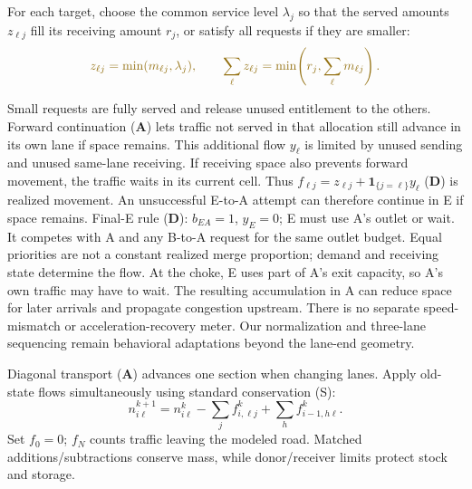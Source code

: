 \documentclass[10pt,a4paper]{article}
\newcommand{\Carey}[1]{\textcolor{SrcCarey}{#1}}
\newcommand{\Own}[1]{\textcolor{Own}{#1}}
\newcommand{\Std}[1]{\textcolor{Standard}{#1}}
\newcommand{\relA}{\textbf{\textsf{A}}}
\newcommand{\relD}{\textbf{\textsf{D}}}
\newcommand{\relS}{\textsf{S}}
\begin{document}
\begin{samepage}
For each target, choose the common service level $\lambda_j$ so that the
served amounts $z_{\ell j}$ fill its receiving amount $r_j$, or satisfy all
requests if they are smaller:
\begin{equation}
 \color{SrcCarey}
 z_{\ell j}=\min(m_{\ell j},\lambda_j),\qquad
 \sum_\ell z_{\ell j}=\min\!\left(r_j,\sum_\ell m_{\ell j}\right).\label{eq:sharing}
\end{equation}
\end{samepage}
Small requests are fully served and release unused entitlement to the others.
\Carey{Forward continuation (\relA)} lets traffic not served in that allocation
still advance in its own lane if space remains. This additional flow
$y_\ell$ is limited by unused sending and unused same-lane receiving.
If receiving space also prevents forward movement, the traffic waits in
its current cell. Thus
\Own{$f_{\ell j}=z_{\ell j}+\mathbf1_{\{j=\ell\}}y_\ell$ (\relD)} is realized movement.
An unsuccessful E-to-A attempt can therefore continue in E if space remains.
\Own{Final-E rule (\relD): $b_{EA}=1$, $y_E=0$}; E must use A's outlet or wait.
It competes with A and any B-to-A request for the same outlet budget.
Equal priorities are not a constant realized merge proportion; demand and
receiving state determine the flow. At the choke, E uses part of A's exit
capacity, so A's own traffic may have to wait. The resulting accumulation
in A can reduce space for later arrivals and propagate congestion upstream.
There is no separate speed-mismatch or acceleration-recovery meter.
Our normalization and three-lane sequencing remain behavioral adaptations
beyond the lane-end geometry.

\Carey{Diagonal transport (\relA)} advances one section when changing lanes.
Apply old-state flows simultaneously using \Std{standard conservation (\relS)}:
\begin{equation}
 n^{k+1}_{i\ell}=n^k_{i\ell}-\sum_j f^k_{i,\ell j}
                             +\sum_h f^k_{i-1,h\ell}.\label{eq:update}
\end{equation}
Set $f_0=0$; $f_N$ counts traffic leaving the modeled road. Matched additions/subtractions
conserve mass, while donor/receiver limits protect stock and storage.
\end{document}
